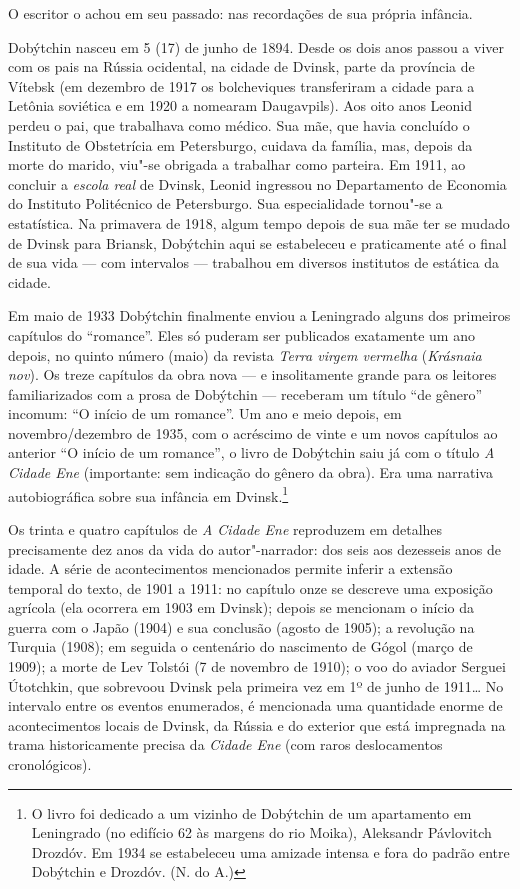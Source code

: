 O escritor o achou em seu passado: nas recordações de sua própria
infância.

Dobýtchin nasceu em 5 (17) de junho de 1894. Desde os dois anos passou a
viver com os pais na Rússia ocidental, na cidade de Dvinsk, parte da
província de Vítebsk (em dezembro de 1917 os bolcheviques transferiram a
cidade para a Letônia soviética e em 1920 a nomearam Daugavpils). Aos
oito anos Leonid perdeu o pai, que trabalhava como médico. Sua mãe, que
havia concluído o Instituto de Obstetrícia em Petersburgo, cuidava da
família, mas, depois da morte do marido, viu"-se obrigada a trabalhar
como parteira. Em 1911, ao concluir a \emph{escola real} de Dvinsk,
Leonid ingressou no Departamento de Economia do Instituto Politécnico de
Petersburgo. Sua especialidade tornou"-se a estatística. Na primavera de
1918, algum tempo depois de sua mãe ter se mudado de Dvinsk para
Briansk, Dobýtchin aqui se estabeleceu e praticamente até o final de sua
vida --- com intervalos --- trabalhou em diversos institutos de estática
da cidade.

Em maio de 1933 Dobýtchin finalmente enviou a Leningrado alguns dos
primeiros capítulos do ``romance''. Eles só puderam ser publicados
exatamente um ano depois, no quinto número (maio) da revista \emph{Terra
virgem vermelha} (\emph{Krásnaia nov}). Os treze capítulos da obra nova
--- e insolitamente grande para os leitores familiarizados com a prosa
de Dobýtchin --- receberam um título ``de gênero'' incomum: ``O início
de um romance''. Um ano e meio depois, em novembro/dezembro de 1935, com
o acréscimo de vinte e um novos capítulos ao anterior ``O início de um
romance'', o livro de Dobýtchin saiu já com o título \emph{A Cidade Ene}
(importante: sem indicação do gênero da obra). Era uma narrativa
autobiográfica sobre sua infância em Dvinsk.\footnote{O livro foi
  dedicado a um vizinho de Dobýtchin de um apartamento em Leningrado (no
  edifício 62 às margens do rio Moika), Aleksandr Pávlovitch Drozdóv. Em
  1934 se estabeleceu uma amizade intensa e fora do padrão entre
  Dobýtchin e Drozdóv. (N. do A.)}

Os trinta e quatro capítulos de \emph{A Cidade Ene} reproduzem em
detalhes precisamente dez anos da vida do autor"-narrador: dos seis aos
dezesseis anos de idade. A série de acontecimentos mencionados permite
inferir a extensão temporal do texto, de 1901 a 1911: no capítulo onze
se descreve uma exposição agrícola (ela ocorrera em 1903 em Dvinsk);
depois se mencionam o início da guerra com o Japão (1904) e sua
conclusão (agosto de 1905); a revolução na Turquia (1908); em seguida o
centenário do nascimento de Gógol (março de 1909); a morte de Lev
Tolstói (7 de novembro de 1910); o voo do aviador Serguei Útotchkin, que
sobrevoou Dvinsk pela primeira vez em 1º de junho de 1911\ldots{} No
intervalo entre os eventos enumerados, é mencionada uma quantidade
enorme de acontecimentos locais de Dvinsk, da Rússia e do exterior que
está impregnada na trama historicamente precisa da \emph{Cidade Ene}
(com raros deslocamentos cronológicos).

